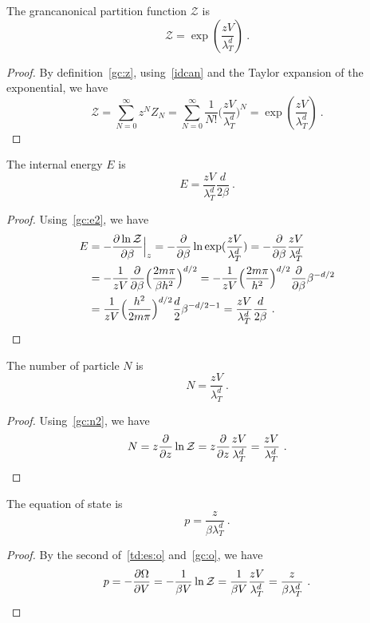     The grancanonical partition function $\mathcal Z$ is 
    \begin{equation*}
        \mathcal Z = \exp(\frac{z V}{\lambda_T^d}) ~.
    \end{equation*}
    \begin{proof}
        By definition~\eqref{gc:z}, using~\eqref{idcan} and the Taylor expansion of the exponential, we have
        \begin{equation*}
            \mathcal Z = \sum_{N=0}^\infty z^N Z_N = \sum_{N=0}^\infty \frac{1}{N!} \Big ( \frac{z V}{\lambda_T^d} \Big)^N = \exp(\frac{z V}{\lambda_T^d}) ~.
        \end{equation*}
    \end{proof}
    The internal energy $E$ is 
    \begin{equation*}
        E = \frac{z V}{\lambda^d_T} \frac{d}{2 \beta} ~.
    \end{equation*}
    \begin{proof}
        Using~\eqref{gc:e2}, we have
        \begin{equation*}
        \begin{aligned}
            E & = - \frac{\partial\ln \mathcal Z}{\partial\beta} \Big \vert_z = - \frac{\partial}{\partial\beta} \ln \exp(\frac{z V}{\lambda_T^d}) = - \frac{\partial}{\partial\beta} \frac{z V}{\lambda^d_T} \\ & = - \frac{1}{zV} \frac{\partial}{\partial\beta} \Big ( \frac{2 m \pi} {\beta h^2} \Big )^{d/2} = - \frac{1}{z V} \Big ( \frac{2 m \pi}{h^2} \Big )^{d/2} \frac{\partial}{\partial\beta} \beta^{-d/2} \\ & = \frac{1}{zV} \Big ( \frac{h^2}{2 m \pi} \Big )^{d/2} \frac{d}{2} \beta^{-d/2 - 1} = \frac{z V}{\lambda^d_T} \frac{d}{2 \beta} ~.
        \end{aligned}
        \end{equation*}
    \end{proof}
    The number of particle $N$ is 
    \begin{equation*}
        N = \frac{zV}{\lambda_T^d} ~.
    \end{equation*}
    \begin{proof}
        Using~\eqref{gc:n2}, we have
        \begin{equation*}
            N = z \frac{\partial}{\partial z} \ln \mathcal Z = z \frac{\partial}{\partial z} \frac{z V}{\lambda_T^d} = \frac{zV}{\lambda_T^d} ~.
        \end{equation*}
    \end{proof}
    The equation of state is 
    \begin{equation*}
        p = \frac{z}{\beta \lambda_T^d} ~.
    \end{equation*}
    \begin{proof}
        By the second of~\eqref{td:es:o} and~\eqref{gc:o}, we have
        \begin{equation*}
            p = - \frac{\partial\Omega}{\partial V} = - \frac{1}{\beta V} \ln \mathcal Z = \frac{1}{\beta V} \frac{z V}{\lambda_T^d} = \frac{z}{\beta \lambda_T^d} ~.
        \end{equation*}
    \end{proof}

